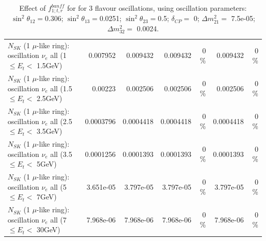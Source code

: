 \begin{table}
\begin{tabular}{| l | r | r | r  r | r  r |}
$N_{SK}$ (1 $\mu$-like ring): oscillation $\nu_{e}$ all (1 $\leq E_{t} <$ 1.5GeV) &        0.007952 &        0.009432 &        0.009432 &        0 \%  &        0.009432 &        0 \%  \\ 
$N_{SK}$ (1 $\mu$-like ring): oscillation $\nu_{e}$ all (1.5 $\leq E_{t} <$ 2.5GeV) &         0.00223 &        0.002506 &        0.002506 &        0 \%  &        0.002506 &        0 \%  \\ 
$N_{SK}$ (1 $\mu$-like ring): oscillation $\nu_{e}$ all (2.5 $\leq E_{t} <$ 3.5GeV) &       0.0003796 &       0.0004418 &       0.0004418 &        0 \%  &       0.0004418 &        0 \%  \\ 
$N_{SK}$ (1 $\mu$-like ring): oscillation $\nu_{e}$ all (3.5 $\leq E_{t} <$ 5GeV) &       0.0001256 &       0.0001393 &       0.0001393 &        0 \%  &       0.0001393 &        0 \%  \\ 
 $N_{SK}$ (1 $\mu$-like ring): oscillation $\nu_{e}$ all (5 $\leq E_{t} <$ 7GeV) &       3.651e-05 &       3.797e-05 &       3.797e-05 &        0 \%  &       3.797e-05 &        0 \%  \\ 
$N_{SK}$ (1 $\mu$-like ring): oscillation $\nu_{e}$ all (7 $\leq E_{t} <$ 30GeV) &       7.968e-06 &       7.968e-06 &       7.968e-06 &        0 \%  &       7.968e-06 &        0 \%  \\ 
\hline
\hline
\end{tabular}
\caption{ Effect of $f_{1; t, r}^{banff}$ for for 3 flavour oscillations, using oscillation parameters:  $\sin^2\theta_{12} = $0.306; $\sin^2\theta_{13} = $0.0251; $\sin^2\theta_{23} = $0.5; $\delta_{CP} = $        0; $\Delta m^2_{21} = $    7.5e-05; $\Delta m^2_{32} = $    0.0024. }
\label{tab:num_banff_01_1RmuT_3f_osc_t13:0.0251}
\end{table}
\clearpage
